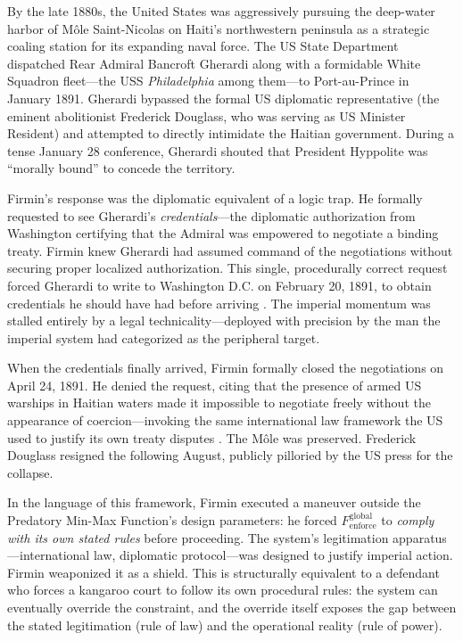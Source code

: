 By the late 1880s, the United States was aggressively pursuing the deep-water harbor of Môle Saint-Nicolas on Haiti's northwestern peninsula as a strategic coaling station for its expanding naval force. The US State Department dispatched Rear Admiral Bancroft Gherardi along with a formidable White Squadron fleet---the USS \textit{Philadelphia} among them---to Port-au-Prince in January 1891. Gherardi bypassed the formal US diplomatic representative (the eminent abolitionist Frederick Douglass, who was serving as US Minister Resident) and attempted to directly intimidate the Haitian government. During a tense January 28 conference, Gherardi shouted that President Hyppolite was ``morally bound'' to concede the territory.

Firmin's response was the diplomatic equivalent of a logic trap. He formally requested to see Gherardi's \textit{credentials}---the diplomatic authorization from Washington certifying that the Admiral was empowered to negotiate a binding treaty. Firmin knew Gherardi had assumed command of the negotiations without securing proper localized authorization. This single, procedurally correct request forced Gherardi to write to Washington D.C. on February 20, 1891, to obtain credentials he should have had before arriving \cite{firmin_legacy}. The imperial momentum was stalled entirely by a legal technicality---deployed with precision by the man the imperial system had categorized as the peripheral target.

When the credentials finally arrived, Firmin formally closed the negotiations on April 24, 1891. He denied the request, citing that the presence of armed US warships in Haitian waters made it impossible to negotiate freely without the appearance of coercion---invoking the same international law framework the US used to justify its own treaty disputes \cite{firmin_legacy}. The Môle was preserved. Frederick Douglass resigned the following August, publicly pilloried by the US press for the collapse.

In the language of this framework, Firmin executed a maneuver outside the Predatory Min-Max Function's design parameters: he forced $F_{\text{enforce}}^{\text{global}}$ to \textit{comply with its own stated rules} before proceeding. The system's legitimation apparatus---international law, diplomatic protocol---was designed to justify imperial action. Firmin weaponized it as a shield. This is structurally equivalent to a defendant who forces a kangaroo court to follow its own procedural rules: the system can eventually override the constraint, and the override itself exposes the gap between the stated legitimation (rule of law) and the operational reality (rule of power).

